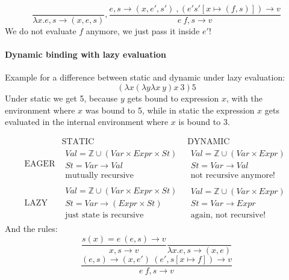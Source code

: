 \documentclass{article}
\begin{document}
$$\frac{}{\lambda x.e,s\rightarrow (x, e,s)},
\frac{e, s\rightarrow (x, e', s')\ , (e's'[x\mapsto (f,s)])\rightarrow v}{e\ f,s\rightarrow v}$$
We do not evaluate $ f $ anymore, we just pass it inside $ e' $!
\paragraph{Dynamic binding with lazy evaluation}
Example for a difference between static and dynamic under lazy evaluation:
$$(\lambda x(\lambda y\lambda x\ y)x\ 3)5$$
Under static we get 5, because $ y $ gets bound to expression $ x $, with the environment where $ x $ was bound to 5, while in static the expression $x$ gets evaluated in the internal environment where $ x $ is bound to 3.

$$
\begin{array}{c|c|c}
& \text{STATIC}& \text{DYNAMIC}\\\hline
\text{EAGER} &
	\begin{matrix}
		Val=\mathbb{Z}\cup (Var\times Expr\times St)\\
		St=Var\rightarrow Val\\
		\text{mutually recursive}
	\end{matrix} &
	\begin{matrix}
		Val=\mathbb{Z}\cup (Var\times Expr)\\
		St=Var\rightarrow Val\\
		\text{not recursive anymore!}
	\end{matrix}\\\hline
\text{LAZY} &
	\begin{matrix}
		Val=\mathbb{Z}\cup (Var\times Expr\times St)\\
		St=Var\rightarrow (Expr \times St)\\
		\text{just state is recursive}
	\end{matrix} &
	\begin{matrix}
		Val=\mathbb{Z}\cup (Var\times Expr)\\
		St=Var\rightarrow Expr\\
		\text{again, not recursive!}
	\end{matrix}
\end{array}
$$
And the rules:
$$
\frac{s(x)=e\ (e,s)\rightarrow v}{x,s\rightarrow v}
\frac{}{\lambda x.e,s\rightarrow (x, e)}$$$$
\frac{(e, s)\rightarrow (x, e')\ (e', s[x\mapsto f])\rightarrow v}{e\ f,s\rightarrow v}$$
\end{document}

